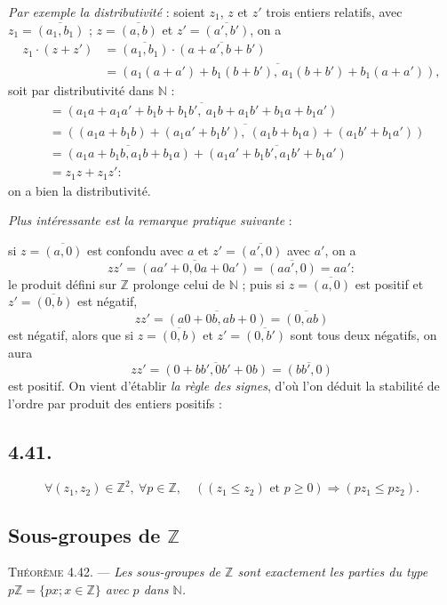 \emph{Par exemple la distributivité} : soient $z_1$, $z$ et $z'$ trois entiers relatifs, avec $z_1=\overline{(a_1,b_1)}$ ; $z=\overline{(a,b)}$ et $z'=\overline{(a',b')}$, on a
\begin{align*}
z_1\cdot(z+z')
&=\overline{(a_1,b_1)}\cdot\overline{(a+a',b+b')}\\
&=\overline{(a_1(a+a')+b_1(b+b'),\ a_1(b+b')+b_1(a+a'))},
\end{align*}
soit par distributivité dans $\mathbb N$ :
\begin{align*}
&=\overline{(a_1a+a_1a'+b_1b+b_1b',\ a_1b+a_1b'+b_1a+b_1a')}\\
&=\overline{((a_1a+b_1b)+(a_1a'+b_1b'),\ (a_1b+b_1a)+(a_1b'+b_1a'))}\\
&=\overline{(a_1a+b_1b,a_1b+b_1a)}+\overline{(a_1a'+b_1b',a_1b'+b_1a')}\\
&=z_1z+z_1z' :
\end{align*}
on a bien la distributivité.

\emph{Plus intéressante est la remarque pratique suivante} :

si $z=\overline{(a,0)}$ est confondu avec $a$ et $z'=\overline{(a',0)}$ avec $a'$, on a
\[
zz'=\overline{(aa'+0,0a+0a')}=\overline{(aa',0)}=aa' :
\]
le produit défini sur $\mathbb Z$ prolonge celui de $\mathbb N$ ; puis si $z=\overline{(a,0)}$ est positif et $z'=\overline{(0,b)}$ est négatif,
\[
zz'=\overline{(a0+0b,ab+0)}=\overline{(0,ab)}
\]
est négatif, alors que si $z=\overline{(0,b)}$ et $z'=\overline{(0,b')}$ sont tous deux négatifs, on aura
\[
zz'=\overline{(0+bb',0b'+0b)}=\overline{(bb',0)}
\]
est positif. On vient d'établir \emph{la règle des signes}, d'où l'on déduit la stabilité de l'ordre par produit des entiers positifs :

\subsection*{4.41.}
\[
\forall(z_1,z_2)\in\mathbb Z^2,\ \forall p\in\mathbb Z,
\quad ((z_1\le z_2)\text{ et }p\ge0)\Rightarrow(pz_1\le pz_2).
\]

\subsection*{Sous-groupes de $\mathbb Z$}

\medskip\noindent\textsc{Théorème 4.42.} --- \emph{Les sous-groupes de $\mathbb Z$ sont exactement les parties du type $p\mathbb Z=\{px;x\in\mathbb Z\}$ avec $p$ dans $\mathbb N$.}

